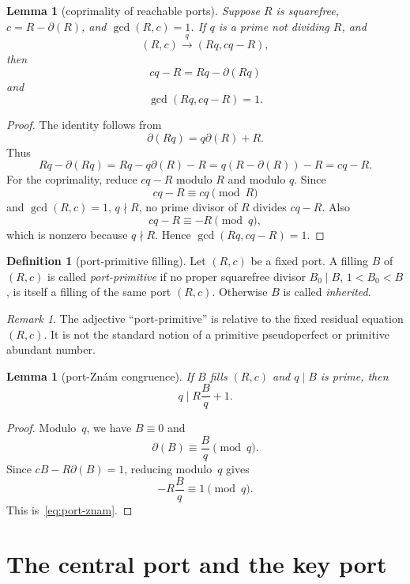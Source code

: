 \documentclass[11pt]{amsart}
\theoremstyle{plain}
\newtheorem{lemma}[theorem]{Lemma}
\theoremstyle{definition}
\newtheorem{definition}[theorem]{Definition}
\theoremstyle{remark}
\newtheorem{remark}[theorem]{Remark}
\newcommand{\dd}{\partial}
\begin{document}
\begin{lemma}[coprimality of reachable ports]\label{lem:reachable-coprime}
Suppose $R$ is squarefree, $c=R-\dd(R)$, and $\gcd(R,c)=1$.  If $q$ is a prime not dividing $R$, and
\[
        (R,c)\xrightarrow{q}(Rq,cq-R),
\]
then
\[
        cq-R=Rq-\dd(Rq)
\]
and
\[
        \gcd(Rq,cq-R)=1.
\]
\end{lemma}

\begin{proof}
The identity follows from
\[
        \dd(Rq)=q\dd(R)+R.
\]
Thus
\[
        Rq-\dd(Rq)=Rq-q\dd(R)-R=q(R-\dd(R))-R=cq-R.
\]
For the coprimality, reduce $cq-R$ modulo $R$ and modulo $q$.  Since
\[
        cq-R\equiv cq\pmod R
\]
and $\gcd(R,c)=1$, $q\nmid R$, no prime divisor of $R$ divides $cq-R$.  Also
\[
        cq-R\equiv -R\pmod q,
\]
which is nonzero because $q\nmid R$.  Hence $\gcd(Rq,cq-R)=1$.
\end{proof}

\begin{definition}[port-primitive filling]\label{def:primitive-filling}
Let $(R,c)$ be a fixed port.  A filling $B$ of $(R,c)$ is called \emph{port-primitive} if no proper squarefree divisor $B_0\mid B$, $1<B_0<B$, is itself a filling of the same port $(R,c)$.  Otherwise $B$ is called \emph{inherited}.
\end{definition}

\begin{remark}
The adjective ``port-primitive'' is relative to the fixed residual equation $(R,c)$.  It is not the standard notion of a primitive pseudoperfect or primitive abundant number.
\end{remark}

\begin{lemma}[port-Zn\'am congruence]\label{lem:port-znam}
If $B$ fills $(R,c)$ and $q\mid B$ is prime, then
\begin{equation}\label{eq:port-znam}
        q\mid R\frac{B}{q}+1.
\end{equation}
\end{lemma}

\begin{proof}
Modulo~$q$, we have $B\equiv0$ and
\[
        \dd(B)\equiv \frac Bq\pmod q.
\]
Since $cB-R\dd(B)=1$, reducing modulo~$q$ gives
\[
        -R\frac Bq\equiv1\pmod q.
\]
This is~\eqref{eq:port-znam}.
\end{proof}

\section{The central port and the key port}
\end{document}
